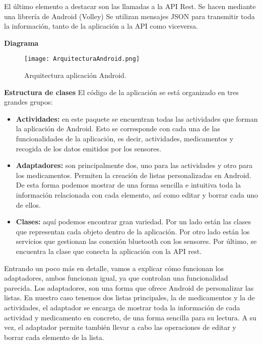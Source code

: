 El último elemento a destacar son las llamadas a la API Rest. Se hacen mediante una librería de Android (Volley) Se utilizan mensajes JSON para transmitir toda la información, tanto de la aplicación a la API como viceversa.
\newline

{\bf Diagrama}
\begin{figure}[h!]
  \centering
  \texttt{[image: ArquitecturaAndroid.png]}
  \caption{Arquitectura aplicación Android.}
\end{figure}

{\bf Estructura de clases}
\newline
\newline
El código de la aplicación se está organizado en tres grandes grupos:

\begin{itemize}
	\item {\bf Actividades: } en este paquete se encuentran todas las actividades que forman la aplicación de Android. Esto se corresponde con cada una de las funcionalidades de la aplicación, es decir, actividades, medicamentos y recogida de los datos emitidos por los sensores.
    \item {\bf Adaptadores: } son principalmente dos, uno para las actividades y otro para los medicamentos. Permiten la creación de listas personalizadas en Android. De esta forma podemos mostrar de una forma sencilla e intuitiva toda la información relacionada con cada elemento, así como editar y borrar cada uno de ellos.
    \item {\bf Clases: } aquí podemos encontrar gran variedad. Por un lado están las clases que representan cada objeto dentro de la aplicación. Por otro lado están los servicios que gestionan las conexión bluetooth con los sensores. Por último, se encuentra la clase que conecta la aplicación con la API rest.
\newline
\end{itemize}

Entrando un poco más en detalle, vamos a explicar cómo funcionan los adaptadores, ambos funcionan igual, ya que controlan una funcionalidad parecida. Los adaptadores, son una forma que ofrece Android de personalizar las listas. En nuestro caso tenemos dos listas principales, la de medicamentos y la de actividades, el adaptador se encarga de mostrar toda la información de cada actividad y medicamento en concreto, de una forma sencilla para su lectura. A su vez, el adaptador permite también llevar a cabo las operaciones de editar y borrar cada elemento de la lista.
\newline

